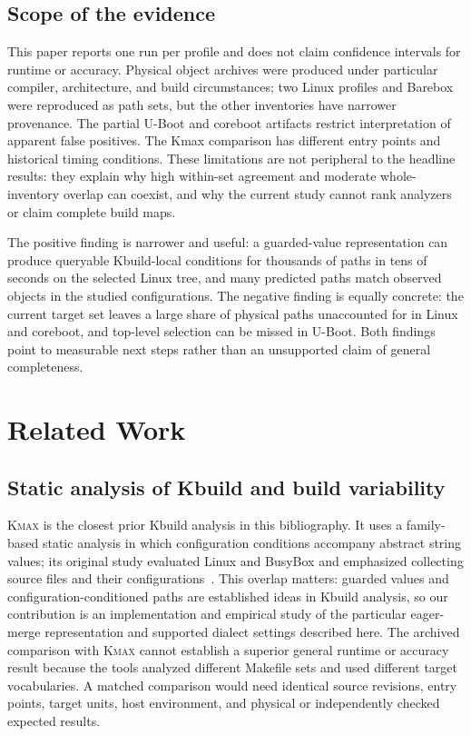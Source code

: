\documentclass[acmsmall,screen,review]{acmart}
\begin{document}
\subsection{Scope of the evidence}
This paper reports one run per profile and does not claim confidence intervals for runtime or accuracy. Physical object archives were produced under particular compiler, architecture, and build circumstances; two Linux profiles and Barebox were reproduced as path sets, but the other inventories have narrower provenance. The partial U-Boot and coreboot artifacts restrict interpretation of apparent false positives. The Kmax comparison has different entry points and historical timing conditions. These limitations are not peripheral to the headline results: they explain why high within-set agreement and moderate whole-inventory overlap can coexist, and why the current study cannot rank analyzers or claim complete build maps.

The positive finding is narrower and useful: a guarded-value representation can produce queryable Kbuild-local conditions for thousands of paths in tens of seconds on the selected Linux tree, and many predicted paths match observed objects in the studied configurations. The negative finding is equally concrete: the current target set leaves a large share of physical paths unaccounted for in Linux and coreboot, and top-level selection can be missed in U-Boot. Both findings point to measurable next steps rather than an unsupported claim of general completeness.

\section{Related Work}
\label{sec:related}

\subsection{Static analysis of Kbuild and build variability}
\textsc{Kmax} is the closest prior Kbuild analysis in this bibliography. It uses a family-based static analysis in which configuration conditions accompany abstract string values; its original study evaluated Linux and BusyBox and emphasized collecting source files and their configurations~\cite{kmax}. This overlap matters: guarded values and configuration-conditioned paths are established ideas in Kbuild analysis, so our contribution is an implementation and empirical study of the particular eager-merge representation and supported dialect settings described here. The archived comparison with \textsc{Kmax} cannot establish a superior general runtime or accuracy result because the tools analyzed different Makefile sets and used different target vocabularies. A matched comparison would need identical source revisions, entry points, target units, host environment, and physical or independently checked expected results.
\end{document}
